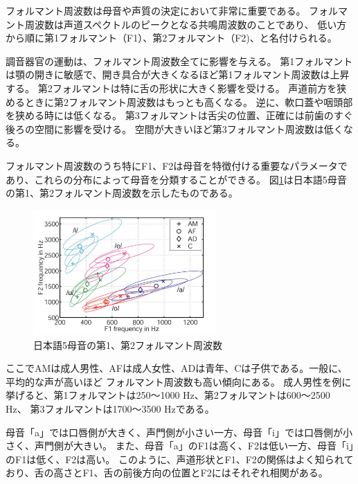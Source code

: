 \documentclass[12ptj,a4j,dvipdfmx,uplatex, titlepage]{jsarticle}
\begin{document}
フォルマント周波数は母音や声質の決定において非常に重要である。
フォルマント周波数は声道スペクトルのピークとなる共鳴周波数のことであり、
低い方から順に第1フォルマント（F1）、第2フォルマント（F2)、と名付けられる。

調音器官の運動は、フォルマント周波数全てに影響を与える。
第1フォルマントは顎の開きに敏感で、開き具合が大きくなるほど第1フォルマント周波数は上昇する。
第2フォルマントは特に舌の形状に大きく影響を受ける。
声道前方を狭めるときに第2フォルマント周波数はもっとも高くなる。
逆に、軟口蓋や咽頭部を狭める時には低くなる。
第3フォルマントは舌尖の位置、正確には前歯のすぐ後ろの空間に影響を受ける。
空間が大きいほど第3フォルマント周波数は低くなる。

フォルマント周波数のうち特にF1、F2は母音を特徴付ける重要なパラメータであり、これらの分布によって母音を分類することができる\cite{japanese_vowels}。
図\ref{fig:jp_formant}は日本語5母音の第1、第2フォルマント周波数を示したものである。

\begin{figure}[htbp]
    \begin{center}
      \includegraphics[clip,width=7.0cm]{5母音.png}
      \caption{日本語5母音の第1、第2フォルマント周波数\cite{japanese_vowels}}
      \label{fig:jp_formant}
    \end{center}
  \end{figure}
  ここでAMは成人男性、AFは成人女性、ADは青年、Cは子供である。一般に、平均的な声が高いほど
  フォルマント周波数も高い傾向にある。
  成人男性を例に挙げると、第1フォルマントは250〜1000 \si{Hz}、第2フォルマントは600〜2500 \si{Hz}、
  第3フォルマントは1700〜3500 \si{Hz}である\cite{science}。





母音「a」では口唇側が大きく、声門側が小さい一方、母音「i」では口唇側が小さく、声門側が大きい。
また、母音「a」のF1は高く、F2は低い一方、母音「i」のF1は低く、F2は高い。
このように、声道形状とF1、F2の関係はよく知られており、舌の高さとF1、舌の前後方向の位置とF2にはそれぞれ相関がある\cite{katei}。
\end{document}
